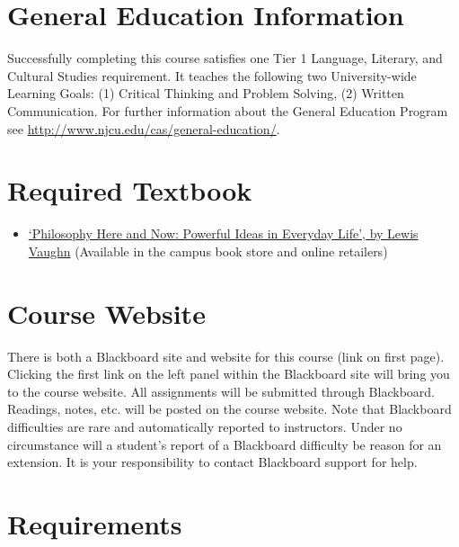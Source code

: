 \documentclass[article,oneside]{memoir}
\begin{document}
\section{General Education Information} 
Successfully completing this course satisfies one Tier 1 Language, Literary, and Cultural Studies requirement. It teaches the following two University-wide Learning Goals: (1) Critical Thinking and Problem Solving, (2) Written Communication. For further information about the General Education Program see \href{http://www.njcu.edu/cas/general-education/}{http://www.njcu.edu/cas/general-education/}.

\section{Required Textbook}

\begin{itemize}
\item
  \href{http://www.amazon.com/Philosophy-Here-Now-Powerful-Everyday/dp/0199765227}{`Philosophy  Here and Now: Powerful Ideas in Everyday Life', by Lewis Vaughn}  (Available in the campus book store and online retailers)
\end{itemize}


\section{Course Website}
There is both a Blackboard site and website for this course (link on first page). Clicking the first link on the left panel within the Blackboard site will bring you to the course website. All assignments will be submitted through Blackboard. Readings, notes, etc. will be posted on the course website. Note that Blackboard difficulties are rare and automatically reported to instructors. Under no circumstance will a student's report of a Blackboard difficulty be reason for an extension. It is your responsibility to contact Blackboard support for help.




\section{Requirements}
\end{document}
